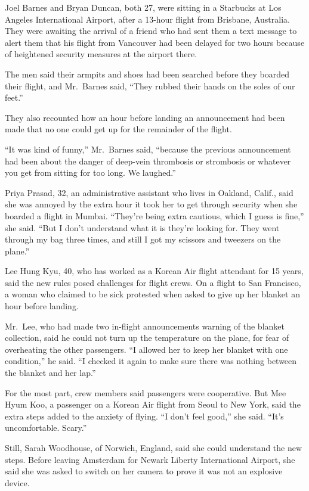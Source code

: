 ﻿\documentclass[12pt]{article}
\begin{document}
Joel Barnes and Bryan Duncan, both 27, were sitting in a Starbucks at Los Angeles International
Airport, after a 13-hour flight from Brisbane, Australia. They were awaiting the arrival of a friend
who had sent them a text message to alert them that his flight from Vancouver had been delayed for
two hours because of heightened security measures at the airport there.

The men said their armpits and shoes had been searched before they boarded their flight, and
Mr.~Barnes said, ``They rubbed their hands on the soles of our feet.''

They also recounted how an hour before landing an announcement had been made that no one could get
up for the remainder of the flight.

``It was kind of funny,'' Mr.~Barnes said, ``because the previous announcement had been about the
danger of deep-vein thrombosis or strombosis or whatever you get from sitting for too long. We
laughed.''

Priya Prasad, 32, an administrative assistant who lives in Oakland, Calif., said she was annoyed by
the extra hour it took her to get through security when she boarded a flight in Mumbai. ``They're
being extra cautious, which I guess is fine,'' she said. ``But I don't understand what it is they're
looking for. They went through my bag three times, and still I got my scissors and tweezers on the
plane.''

Lee Hung Kyu, 40, who has worked as a Korean Air flight attendant for 15 years, said the new rules
posed challenges for flight crews. On a flight to San Francisco, a woman who claimed to be sick
protested when asked to give up her blanket an hour before landing.

Mr.~Lee, who had made two in-flight announcements warning of the blanket collection, said he could
not turn up the temperature on the plane, for fear of overheating the other passengers. ``I allowed
her to keep her blanket with one condition,'' he said. ``I checked it again to make sure there was
nothing between the blanket and her lap.''

For the most part, crew members said passengers were cooperative. But Mee Hyum Koo, a passenger on a
Korean Air flight from Seoul to New York, said the extra steps added to the anxiety of flying. ``I
don't feel good,'' she said. ``It's uncomfortable. Scary.''

Still, Sarah Woodhouse, of Norwich, England, said she could understand the new steps. Before leaving
Amsterdam for Newark Liberty International Airport, she said she was asked to switch on her camera
to prove it was not an explosive device.
\end{document}
